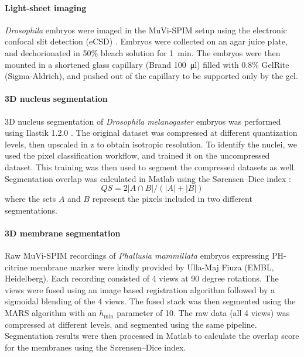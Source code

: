 \paragraph{Light-sheet imaging}
\textit{Drosophila} embryos were imaged in the MuVi-SPIM setup \cite{krzic_multiview_2012} using the electronic confocal slit detection (eCSD) \cite{de_medeiros_confocal_2015}. Embryos were collected on an agar juice plate, and dechorionated in 50\% bleach solution for \SI{1}{min}. The embryos were then mounted in a shortened glass capillary (Brand \SI{100}{\micro l}) filled with 0.8\% GelRite (Sigma-Aldrich), and pushed out of the capillary to be supported only by the gel.

\paragraph{3D nucleus segmentation}
3D nucleus segmentation of \textit{Drosophila melanogaster} embryos was performed using Ilastik 1.2.0 \cite{sommer_ilastik:_2011}. The original dataset was compressed at different quantization levels, then upscaled in z to obtain isotropic resolution. To identify the nuclei, we used the pixel classification workflow, and trained it on the uncompressed dataset. This training was then used to segment the compressed datasets as well. Segmentation overlap was calculated in Matlab using the Sørensen–Dice index \cite{sorensen_method_1948,dice_measures_1945}:
\begin{equation}
  QS = 2 \left| A \cap B \right| / \left( |A| + |B| \right)
\end{equation}
where the sets $A$ and $B$ represent the pixels included in two different segmentations.

\paragraph{3D membrane segmentation}
Raw MuVi-SPIM recordings of \textit{Phallusia mammillata} embryos expressing PH-citrine membrane marker were kindly provided by Ulla-Maj Fiuza (EMBL, Heidelberg). Each recording consisted of 4 views at 90 degree rotations. The views were fused using an image based registration algorithm followed by a sigmoidal blending of the 4 views.
The fused stack was then segmented using the MARS algorithm \cite{fernandez_imaging_2010} with an $h_\mathrm{min}$ parameter of 10. The raw data (all 4 views) was compressed at different levels, and segmented using the same pipeline. Segmentation results were then processed in Matlab to calculate the overlap score for the membranes using the Sørensen–Dice index.

